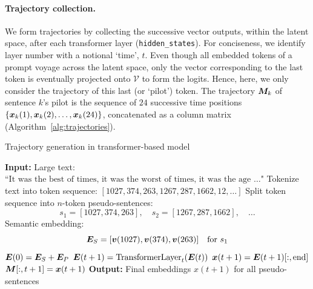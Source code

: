 \documentclass{article} %
\begin{document}
\paragraph{Trajectory collection.}
We form trajectories by collecting the successive vector outputs, within the latent space, after each transformer layer (\verb|hidden_states|).
For conciseness, we identify layer number with a notional `time', $t$.
Even though all embedded tokens of a prompt voyage across the latent space, only the vector corresponding to the last token is eventually projected onto $\mathcal{V}$ to form the logits.
Hence, here, we only consider the trajectory of this last (or `pilot') token.
The trajectory ${\bm{M}}_k$ of sentence $k$'s pilot is the sequence of $24$ successive time positions $\{ {\bm{x}}_k (1), {\bm{x}}_k(2), \ldots, {\bm{x}}_k(24) \}$, concatenated as a column matrix (Algorithm~\ref{alg:trajectories}).

\begin{algorithm}[h]
\caption{Trajectory generation in transformer-based model}
\begin{algorithmic}[1]
\label{alg:trajectories}
\STATE \textbf{Input:} Large text: $\text{``It was the best of times, it was the worst of times, it was the age \ldots"}$
\STATE Tokenize text into token sequence: $[1027, 374, 263, 1267, 287, 1662, 12, \ldots]$
\STATE Split token sequence into $n$-token pseudo-sentences:
\[
  s_1 = [1027, 374, 263], \quad s_2 = [1267, 287, 1662], \quad \ldots
\]
    \STATE Semantic embedding: 
    \[
      {\bm{E}}_S = [{\bm{v}}(1027), {\bm{v}}(374), {\bm{v}}(263)] \quad \text{for } s_1
    \]
    \STATE ${\bm{E}}(0) = {\bm{E}}_S + {\bm{E}}_P$ 
        \STATE 
        $
          {\bm{E}}(t+1) = \text{TransformerLayer}_t ({\bm{E}}(t))
        $ 
        \STATE 
        $          {\bm{x}}(t+1) = {\bm{E}}(t+1)[:, \text{end}]
        $ 
        \STATE 
        $
          {\bm{M}}[:, t+1] = {\bm{x}}(t+1)
        $ 
    \ENDFOR
\ENDFOR
\STATE \textbf{Output:} Final embeddings $x(t+1)$ for all pseudo-sentences
\end{algorithmic}
\end{algorithm}
\end{document}
